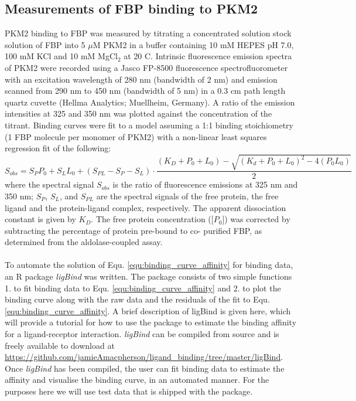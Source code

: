 \subsection{Measurements of FBP binding to PKM2}
\label{subsec:methods_fbp_binding}
PKM2 binding to FBP was measured by titrating a concentrated solution stock solution of FBP into 5 $\mu$M PKM2 in a buffer containing 10 mM HEPES pH 7.0, 100 mM KCl and 10 mM MgCl$_{2}$ at 20 \textdegree C. Intrinsic fluorescence emission spectra of PKM2 were recorded using a Jasco FP-8500 fluorescence spectrofluorometer with an excitation wavelength of 280 nm (bandwidth of 2 nm) and emission scanned from 290 nm to 450 nm (bandwidth of 5 nm) in a 0.3 cm path length quartz cuvette (Hellma Analytics; Muellheim, Germany). A ratio of the emission intensities at 325 and 350 nm was plotted against the concentration of the titrant. Binding curves were fit to a model assuming a 1:1 binding stoichiometry (1 FBP molecule per monomer of PKM2) with a non-linear least squares regression fit of the following:
%
%
\begin{equation}
S_{obs} = S_{P}P_{0} + S_{L}L_{0} + (S_{PL} - S_{P} - S_{L}) \cdot \frac{(K_{D} + P_{0} + L_{0}) - \sqrt{(K_{d} + P_{0} + L_{0})^{2} - 4(P_{0}L_{0})}}{2}
\label{equ:binding_curve_affinity}
\end{equation}
%
%
where the spectral signal $S_{obs}$ is the ratio of fluorescence emissions at 325 nm and 350 nm; $S_{P}$, $S_{L}$, and $S_{PL}$ are the spectral signals of the free protein, the free ligand and the protein-ligand complex, respectively. The apparent dissociation constant is given by $K_{D}$. The free protein concentration ([$P_{0}$]) was corrected by subtracting the percentage of protein pre-bound to co- purified FBP, as determined from the aldolase-coupled assay.
%
%
\\\\
%
%
To automate the solution of Equ. \ref{equ:binding_curve_affinity} for binding data, an R package \textit{ligBind} was written. The package consists of two simple functions 1. to fit binding data to Equ. \ref{equ:binding_curve_affinity} and 2. to plot the binding curve along with the raw data and the residuals of the fit to Equ. \ref{equ:binding_curve_affinity}. A brief description of ligBind is given here, which will provide a tutorial for how to use the package to estimate the binding affinity for a ligand-receptor interaction. \textit{ligBind} can be compiled from source and is freely available to download at \url{https://github.com/jamieAmacpherson/ligand_binding/tree/master/ligBind}. Once \textit{ligBind} has been compiled, the user can fit binding data to estimate the affinity and visualise the binding curve, in an automated manner. For the purposes here we will use test data that is shipped with the package.
